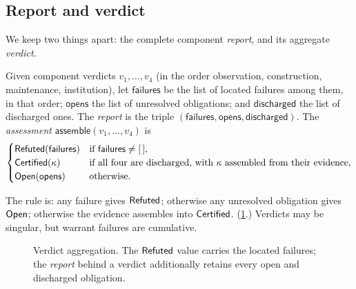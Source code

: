 \subsection{Report and verdict}
We keep two things apart: the complete component \emph{report}, and its aggregate \emph{verdict}.
\begin{defi}[Assembly]\label{def:assembly}
Given component verdicts $v_1,\dots,v_4$ (in the order observation, construction, maintenance, institution), let $\mathsf{failures}$ be the list of located failures among them, in that order; $\mathsf{opens}$ the list of unresolved obligations; and $\mathsf{discharged}$ the list of discharged ones. The \emph{report} is the triple $(\mathsf{failures},\mathsf{opens},\mathsf{discharged})$. The \emph{assessment} $\mathsf{assemble}(v_1,\dots,v_4)$ is
\[
\begin{cases}
\mathsf{Refuted}(\mathsf{failures}) & \text{if } \mathsf{failures} \neq [\,],\\
\mathsf{Certified}(\kappa) & \text{if all four are discharged, with $\kappa$ assembled from their evidence},\\
\mathsf{Open}(\mathsf{opens}) & \text{otherwise.}
\end{cases}
\]
\end{defi}
The rule is: any failure gives $\mathsf{Refuted}$; otherwise any unresolved obligation gives $\mathsf{Open}$; otherwise the evidence assembles into $\mathsf{Certified}$. (\cref{fig:aggregation}.) Verdicts may be singular, but warrant failures are cumulative.
\begin{figure}[t]
\centering
{}
\caption{Verdict aggregation. The $\mathsf{Refuted}$ value carries the located failures; the \emph{report} behind a verdict additionally retains every open and discharged obligation.}
\label{fig:aggregation}
\end{figure}

